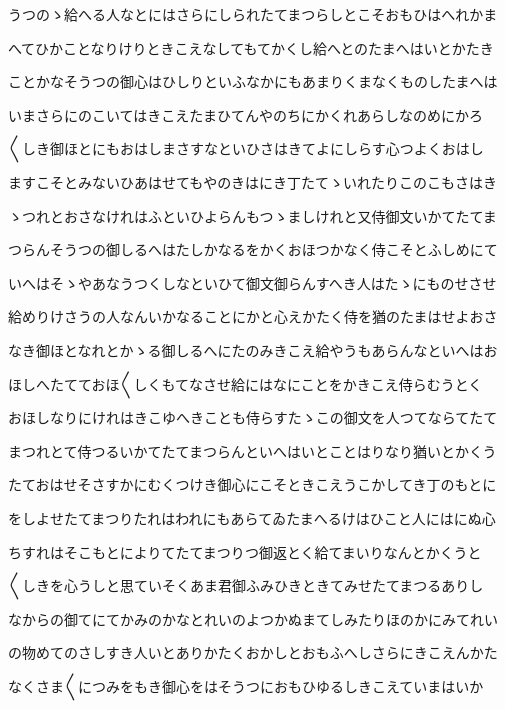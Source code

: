 \documentclass[a4paper,11pt,landscape]{ltjtarticle}
\begin{document}
\par\medskip
うつのゝ給へる人なとにはさらにしられたてまつらしとこそおもひはへれかま
\par\medskip
へてひかことなりけりときこえなしてもてかくし給へとのたまへはいとかたき
\par\medskip
ことかなそうつの御心はひしりといふなかにもあまりくまなくものしたまへは
\par\medskip
いまさらにのこいてはきこえたまひてんやのちにかくれあらしなのめにかろ
\par\medskip
〱しき御ほとにもおはしまさすなといひさはきてよにしらす心つよくおはし
\par\medskip
ますこそとみないひあはせてもやのきはにき丁たてゝいれたりこのこもさはき
\par\medskip
ゝつれとおさなけれはふといひよらんもつゝましけれと又侍御文いかてたてま
\par\medskip
つらんそうつの御しるへはたしかなるをかくおほつかなく侍こそとふしめにて
\par\medskip
いへはそゝやあなうつくしなといひて御文御らんすへき人はたゝにものせさせ
\par\medskip
給めりけさうの人なんいかなることにかと心えかたく侍を猶のたまはせよおさ
\par\medskip
なき御ほとなれとかゝる御しるへにたのみきこえ給やうもあらんなといへはお
\par\medskip
ほしへたてておほ〱しくもてなさせ給にはなにことをかきこえ侍らむうとく
\par\medskip
おほしなりにけれはきこゆへきことも侍らすたゝこの御文を人つてならてたて
\par\medskip
まつれとて侍つるいかてたてまつらんといへはいとことはりなり猶いとかくう
\par\medskip
たておはせそさすかにむくつけき御心にこそときこえうこかしてき丁のもとに
\par\medskip
をしよせたてまつりたれはわれにもあらてゐたまへるけはひこと人にはにぬ心
\par\medskip
ちすれはそこもとによりてたてまつりつ御返とく給てまいりなんとかくうと
\par\medskip
〱しきを心うしと思ていそくあま君御ふみひきときてみせたてまつるありし
\par\medskip
なからの御てにてかみのかなとれいのよつかぬまてしみたりほのかにみてれい
\par\medskip
の物めてのさしすき人いとありかたくおかしとおもふへしさらにきこえんかた
\par\medskip
なくさま〱につみをもき御心をはそうつにおもひゆるしきこえていまはいか
\par\medskip
\end{document}
